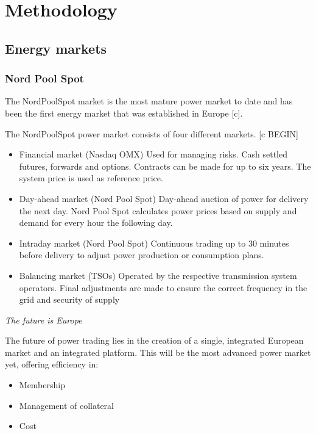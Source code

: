 

\section{Methodology}

\subsection{Energy markets}

\subsubsection{Nord Pool Spot}


The NordPoolSpot market is the most mature power market to date and has been the first energy market that was established in Europe [c]. 

The NordPoolSpot power market consists of four different markets. [c BEGIN]

\begin{itemize}[-]

\item Financial market (Nasdaq OMX)
Used for managing risks. Cash settled futures,
forwards and options. Contracts can be made for
up to six years. The system price is used as
reference price.

\item Day-ahead market (Nord Pool Spot)
Day-ahead auction of power for delivery the next
day. Nord Pool Spot calculates power prices
based on supply and demand for every hour the
following day.

\item Intraday market (Nord Pool Spot)
Continuous trading up to 30 minutes before
delivery to adjust power production or
consumption plans.

\item Balancing market (TSOs)
Operated by the respective transmission system
operators. Final adjustments are made to ensure
the correct frequency in the grid and security of
supply

\end{itemize}

\emph{The future is Europe}

The future of power trading lies in the
creation of a single, integrated
European market and an integrated
platform.
This will be the most advanced power
market yet, offering efficiency in:

\begin{itemize}
\item Membership
\item Management of collateral
\item Cost
\end{itemize}

